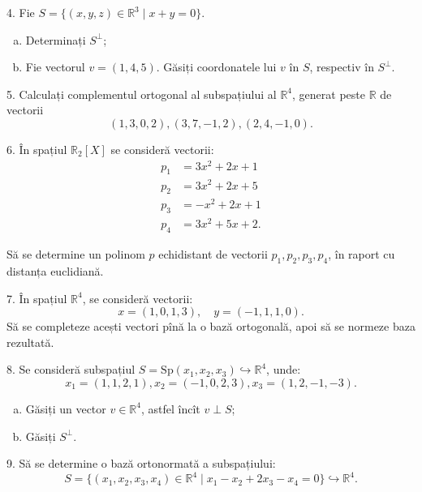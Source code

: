 \documentclass[11pt,a4paper]{article}
\newcommand\RR{\mathbb{R}}
\theoremstyle{dotless}
\theoremstyle{dotlessdr}
\begin{document}
\vspace{1cm}

4. Fie $S = \{ (x, y, z) \in \RR^3 \mid x + y = 0 \}$.
\begin{enumerate}[(a)]
\item Determinați $S^\perp$;
\item Fie vectorul $v = (1, 4, 5)$. Găsiți coordonatele lui $v$ în $S$,
  respectiv în $S^\perp$.
\end{enumerate}

\vspace{1cm}

5. Calculați complementul ortogonal al subspațiului al $\RR^4$, generat
peste $\RR$ de vectorii
\[
  (1, 3, 0, 2), (3, 7, -1, 2), (2, 4, -1, 0).
\]

\vspace{1cm}

6. În spațiul $\RR_2[X]$ se consideră vectorii:
\begin{align*}
  p_1 &= 3x^2 + 2x + 1 \\
  p_2 &= 3x^2 + 2x + 5 \\
  p_3 &= -x^2 + 2x + 1 \\
  p_4 &= 3x^2 + 5x + 2.
\end{align*}

Să se determine un polinom $p$ echidistant de vectorii $p_1, p_2, p_3, p_4$,
în raport cu distanța euclidiană.

\vspace{1cm}

7. În spațiul $\RR^4$, se consideră vectorii:
\[
  x = (1, 0, 1, 3), \quad y = (-1, 1, 1, 0).
\]
Să se completeze acești vectori pînă la o bază ortogonală, apoi să se normeze baza
rezultată.

\vspace{1cm}

8. Se consideră subspațiul $S = \mathrm{Sp}(x_1, x_2, x_3) \hookrightarrow \RR^4$,
unde:
\[
  x_1 = (1, 1, 2, 1), x_2 = (-1, 0, 2, 3), x_3 = (1, 2, -1, -3).
\]

\begin{enumerate}[(a)]
  \item Găsiți un vector $v \in \RR^4$, astfel încît $v \perp S$;
  \item Găsiți $S^\perp$.
\end{enumerate}
  
\vspace{1cm}

9. Să se determine o bază ortonormată a subspațiului:
\[
  S = \{(x_1, x_2, x_3, x_4) \in \RR^4 \mid x_1 - x_2 + 2x_3 - x_4 = 0 \} %
  \hookrightarrow \RR^4.
\]
\end{document}
